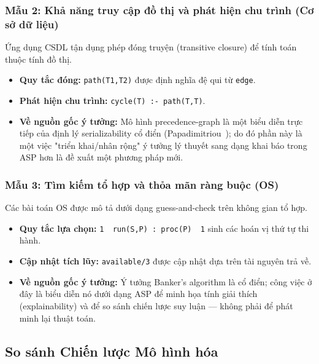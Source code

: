 \documentclass[a4paper,11pt]{article}
\begin{document}
\subsubsection*{Mẫu 2: Khả năng truy cập đồ thị và phát hiện chu trình (Cơ sở dữ liệu)}

Ứng dụng CSDL tận dụng phép đóng truyện (transitive closure) để tính toán thuộc tính đồ thị.
\begin{itemize}
  \item \textbf{Quy tắc đóng:} \texttt{path(T1,T2)} được định nghĩa đệ qui từ \texttt{edge}.
  \item \textbf{Phát hiện chu trình:} \texttt{cycle(T) :- path(T,T)}.
  \item \textbf{Về nguồn gốc ý tưởng:} Mô hình precedence-graph là một biểu diễn trực tiếp của định lý serializability cổ điển
        (Papadimitriou~\cite{Papadimitriou1979}); do đó phần này là một việc "triển khai/nhân rộng" ý tưởng lý thuyết sang dạng khai báo
        trong ASP hơn là đề xuất một phương pháp mới.
\end{itemize}

\subsubsection*{Mẫu 3: Tìm kiếm tổ hợp và thỏa mãn ràng buộc (OS)}

Các bài toán OS được mô tả dưới dạng guess-and-check trên không gian tổ hợp.
\begin{itemize}
  \item \textbf{Quy tắc lựa chọn:} \texttt{1 { run(S,P) : proc(P) } 1} sinh các hoán vị thứ tự thi hành.
  \item \textbf{Cập nhật tích lũy:} \texttt{available/3} được cập nhật dựa trên tài nguyên trả về.
  \item \textbf{Về nguồn gốc ý tưởng:} Ý tưởng Banker's algorithm là cổ điển; công việc ở đây là biểu diễn nó dưới dạng ASP để
        minh họa tính giải thích (explainability) và để so sánh chiến lược suy luận — không phải để phát minh lại thuật toán.
\end{itemize}

\subsection{So sánh Chiến lược Mô hình hóa}
\end{document}
